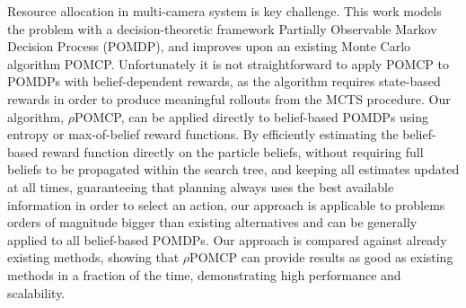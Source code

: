 Resource allocation in multi-camera system is key challenge. This work models the problem with a
decision-theoretic framework Partially Observable Markov Decision Process (POMDP), and improves upon
an existing Monte Carlo algorithm POMCP. Unfortunately it is not straightforward to apply POMCP to
POMDPs with belief-dependent rewards, as the algorithm requires state-based rewards in order to
produce meaningful rollouts from the MCTS procedure. Our algorithm, $\rho$POMCP, can be applied
directly to belief-based POMDPs using entropy or max-of-belief reward functions. By efficiently
estimating the belief-based reward function directly on the particle beliefs, without requiring full
beliefs to be propagated within the search tree, and keeping all estimates updated at all times,
guaranteeing that planning always uses the best available information in order to select an action,
our approach is applicable to problems orders of magnitude bigger than existing alternatives and can
be generally applied to all belief-based POMDPs. Our approach is compared against already existing
methods, showing that $\rho$POMCP can provide results as good as existing methods in a fraction of
the time, demonstrating high performance and scalability.

